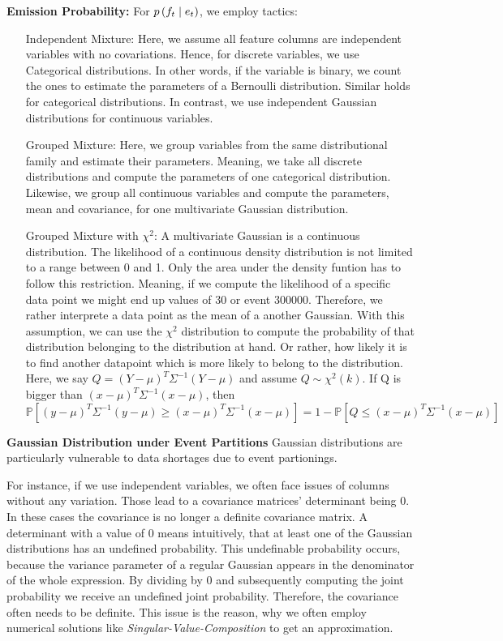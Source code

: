 \documentclass[./../../paper.tex]{subfiles}
\begin{document}
\noindent\textbf{Emission Probability:} For $p\left(f_t \mid e_t\right)$, we employ  tactics:
\begin{enumerate}
    \item[Independent Mixture:] Here, we assume all feature columns are independent variables with no covariations. Hence, for discrete variables, we use Categorical distributions. In other words, if the variable is binary, we count the ones to estimate the parameters of a Bernoulli distribution. Similar holds for categorical distributions. In contrast, we use independent Gaussian distributions for continuous variables. 
    \item[Grouped Mixture:] Here, we group variables from the same distributional family and estimate their parameters. Meaning, we take all discrete distributions and compute the parameters of one categorical distribution. Likewise, we group all continuous variables and compute the parameters, mean and covariance, for one multivariate Gaussian distribution.  
    \item[Grouped Mixture with $\chi^2$:] A multivariate Gaussian is a continuous distribution. The likelihood of a continuous density distribution is not limited to a range between 0 and 1. Only the area under the density funtion has to follow this restriction. Meaning, if we compute the likelihood of a specific data point we might end up values of 30 or event 300000. Therefore, we rather interprete a data point as the mean of a another Gaussian. With this assumption, we can use the $\chi^2$ distribution to compute the probability of that distribution belonging to the distribution at hand. Or rather, how likely it is to find another datapoint which is more likely to belong to the distribution. Here, we say $Q=(Y-\mu)^{T} \Sigma^{-1}(Y-\mu)$  and assume $Q \sim \chi^{2}(k)$. If Q is bigger than $(x-\mu)^{T} \Sigma^{-1}(x-\mu)$, then $\mathbb{P}\left[(y-\mu)^{T} \Sigma^{-1}(y-\mu) \geq(x-\mu)^{T} \Sigma^{-1}(x-\mu)\right]=1-\mathbb{P}\left[Q \leq(x-\mu)^{T} \Sigma^{-1}(x-\mu)\right]$       
\end{enumerate}

\noindent\textbf{Gaussian Distribution under Event Partitions}
Gaussian distributions are particularly vulnerable to data shortages due to event partionings. 

For instance, if we use independent variables, we often face issues of columns without any variation. Those lead to a covariance matrices' determinant being 0. In these cases the covariance is no longer a definite covariance matrix. A determinant with a value of 0 means intuitively, that at least one of the Gaussian distributions has an undefined probability. This undefinable probability occurs, because the variance parameter of a regular Gaussian appears in the denominator of the whole expression. By dividing by 0 and subsequently computing the joint probability we receive an undefined joint probability. Therefore, the covariance often needs to be definite. This issue is the reason, why  we often employ numerical solutions like \emph{Singular-Value-Composition} to get an approximation. 
\end{document}
